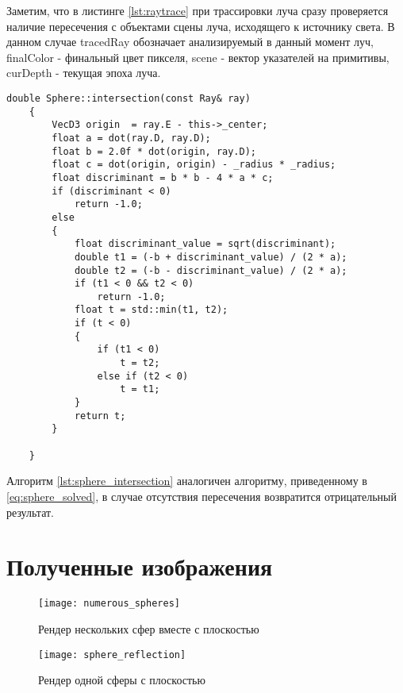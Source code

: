 Заметим, что в листинге \ref{lst:raytrace} при трассировки луча сразу проверяется наличие пересечения с объектами сцены луча, исходящего к источнику света.
В данном случае tracedRay обозначает анализируемый в данный момент луч, finalColor - финальный цвет пикселя, scene - вектор указателей на примитивы, curDepth - текущая эпоха луча.


\begin{lstlisting}[label = lst:sphere_intersection,caption= {Алгоритм поиска пересечения со сферой}]
    double Sphere::intersection(const Ray& ray)
    {
        VecD3 origin  = ray.E - this->_center;
        float a = dot(ray.D, ray.D);
        float b = 2.0f * dot(origin, ray.D);
        float c = dot(origin, origin) - _radius * _radius;
        float discriminant = b * b - 4 * a * c;
        if (discriminant < 0)
            return -1.0; 
        else
        {
            float discriminant_value = sqrt(discriminant);
            double t1 = (-b + discriminant_value) / (2 * a);
            double t2 = (-b - discriminant_value) / (2 * a);
            if (t1 < 0 && t2 < 0)
                return -1.0;
            float t = std::min(t1, t2);
            if (t < 0)
            {
                if (t1 < 0)
                    t = t2;
                else if (t2 < 0)
                    t = t1;
            }
            return t;
        }
    
    }
\end{lstlisting}

Алгоритм \ref{lst:sphere_intersection} аналогичен алгоритму, приведенному в \ref{eq:sphere_solved}, в случае отсутствия пересечения возвратится отрицательный
результат.

\section{Полученные изображения}
\begin{figure}[h]
	\centering
	\texttt{[image: numerous\_spheres]}
	\caption{Рендер нескольких сфер вместе с плоскостью}
	\label{fig:numerous_spheres}
\end{figure}

\begin{figure}[h]
	\centering
	\texttt{[image: sphere\_reflection]}
	\caption{Рендер одной сферы с плоскостью}
	\label{fig:numerous_spheres}
\end{figure}